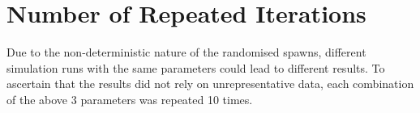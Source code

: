 \section{Number of Repeated Iterations}
Due to the non-deterministic nature of the randomised spawns, different simulation runs with the same parameters could lead to different results. To ascertain that the results did not rely on unrepresentative data, each combination of the above 3 parameters was repeated 10 times.
